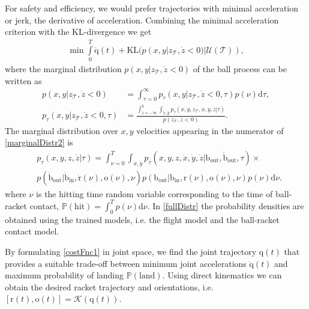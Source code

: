 \documentclass[letterpaper, 10 pt, conference]{ieeeconf}
\newcommand{\boldvec}[1]{\boldsymbol{\mathrm{#1}}}
\let\vec\boldvec
\newcommand{\kin}{\mathcal{K}} %
\newcommand{\joint}{\vec{q}} %
\newcommand{\ball}{\vec{b}} %
\newcommand{\racket}{\vec{r}} %
\newcommand{\orient}{\vec{o}} %
\newcommand{\court}{\mathcal{T}} %
\newcommand{\prob}{\mathbb{P}} %
\newcommand{\landTime}{\tau} %
\newcommand{\hitTime}{\nu} %
\newcommand{\hitDist}{p(\nu)} %
\begin{document}
For safety and efficiency, we would prefer trajectories with minimal acceleration or jerk, the derivative of acceleration. Combining the minimal acceleration criterion with the KL-divergence we get
%
\begin{align}
\min \int\limits_{0}^{T}\ddot{\joint}(t) + \textrm{KL}(p(x,y|z_{\court},\dot{z}<0)|\mathcal{U}(\court)),
\label{costFnc1}
\end{align}
%
where the marginal distribution $p(x,y|z_{\court},\dot{z}<0)$ of the ball process can be written as
%
\begin{align}
p(x,y|z_{\court},\dot{z}<0) &= \int_{\landTime = 0}^{\infty} p_{\landTime}(x,y|z_{\court},\dot{z}<0,\landTime)\hitDist \textrm{d}\landTime \label{marginalDistr1}, \\
p_{\landTime}(x,y|z_{\court},\dot{z}<0,\landTime) &= \frac{ \int_{\dot{z}=-\infty}^{0}\int_{\dot{x},\dot{y}}p_{\landTime}(x,y,z_{\court},\dot{x},\dot{y},\dot{z}|\landTime)}{p(z_{\court},\dot{z}<0)}.
\label{marginalDistr2}
\end{align}
%
The marginal distribution over $x,y$ velocities appearing in the numerator of \eqref{marginalDistr2} is
\begin{align}
& p_{\landTime}(x,y,z,\dot{z}|\landTime) = \int_{\hitTime = 0}^{T} \int_{\dot{x},\dot{y}}  p_{\landTime}(x,y,z,\dot{x},\dot{y},\dot{z}|\ball_{\textrm{out}},\dot{\ball}_{\textrm{out}},\landTime) \times \\
& p(\dot{\ball}_{\textrm{out}}|\dot{\ball}_{\textrm{in}},\dot{\racket}(\hitTime),\orient(\hitTime),\hitTime)p(\ball_{\textrm{out}}|\ball_{\textrm{in}},\racket(\hitTime),\orient(\hitTime),\hitTime)\hitDist\textrm{d}\hitTime.
\label{fullDistr}
\end{align}
%
where $\hitTime$ is the hitting time random variable corresponding to the time of ball-racket contact, $\prob(\textrm{hit}) = \int_{0}^{T}\hitDist\textrm{d}\hitTime$. In \eqref{fullDistr} the probability densities are obtained using the trained models, i.e. the flight model and the ball-racket contact model. 

By formulating \eqref{costFnc1} in joint space, we find the joint trajectory $\joint(t)$ that provides a suitable trade-off between minimum joint accelerations $\ddot{\joint}(t)$ and maximum probability of landing $\prob(\textrm{land})$. Using direct kinematics we can obtain the desired racket trajectory and orientations, i.e. $[\racket(t),\orient(t)] = \kin(\joint(t))$.
\end{document}
